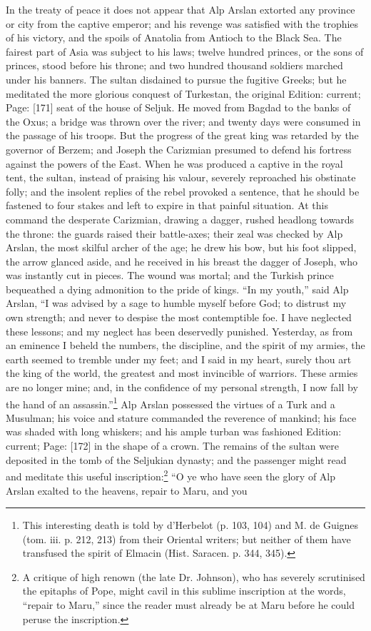 In the treaty of peace it does not appear that Alp Arslan extorted any province or city from the captive emperor; and his revenge was satisfied with the trophies of his victory, and the spoils of Anatolia from Antioch to the Black Sea. The fairest part of Asia was subject to his laws; twelve hundred princes, or the sons of princes, stood before his throne; and two hundred thousand soldiers marched under his banners. The sultan disdained to pursue the fugitive Greeks; but he meditated the more glorious conquest of Turkestan, the original Edition: current; Page: [171] seat of the house of Seljuk. He moved from Bagdad to the banks of the Oxus; a bridge was thrown over the river; and twenty days were consumed in the passage of his troops. But the progress of the great king was retarded by the governor of Berzem; and Joseph the Carizmian presumed to defend his fortress against the powers of the East. When he was produced a captive in the royal tent, the sultan, instead of praising his valour, severely reproached his obstinate folly; and the insolent replies of the rebel provoked a sentence, that he should be fastened to four stakes and left to expire in that painful situation. At this command the desperate Carizmian, drawing a dagger, rushed headlong towards the throne: the guards raised their battle-axes; their zeal was checked by Alp Arslan, the most skilful archer of the age; he drew his bow, but his foot slipped, the arrow glanced aside, and he received in his breast the dagger of Joseph, who was instantly cut in pieces. The wound was mortal; and the Turkish prince bequeathed a dying admonition to the pride of kings. \texthebrew{“}In my youth,\texthebrew{}” said Alp Arslan, \texthebrew{“}I was advised by a sage to humble myself before God; to distrust my own strength; and never to despise the most contemptible foe. I have neglected these lessons; and my neglect has been deservedly punished. Yesterday, as from an eminence I beheld the numbers, the discipline, and the spirit of my armies, the earth seemed to tremble under my feet; and I said in my heart, surely thou art the king of the world, the greatest and most invincible of warriors. These armies are no longer mine; and, in the confidence of my personal strength, I now fall by the hand of an assassin.\texthebrew{}”\footnote{This interesting death is told by d\texthebrew{}’Herbelot (p. 103, 104) and M. de Guignes (tom. iii. p. 212, 213) from their Oriental writers; but neither of them have transfused the spirit of Elmacin (Hist. Saracen. p. 344, 345).} Alp Arslan possessed the virtues of a Turk and a Musulman; his voice and stature commanded the reverence of mankind; his face was shaded with long whiskers; and his ample turban was fashioned Edition: current; Page: [172] in the shape of a crown. The remains of the sultan were deposited in the tomb of the Seljukian dynasty; and the passenger might read and meditate this useful inscription:\footnote{A critique of high renown (the late Dr. Johnson), who has severely scrutinised the epitaphs of Pope, might cavil in this sublime inscription at the words, \texthebrew{“}repair to Maru,\texthebrew{}” since the reader must already be at Maru before he could peruse the inscription.} \texthebrew{“}O ye who have seen the glory of Alp Arslan exalted to the heavens, repair to Maru, and you 